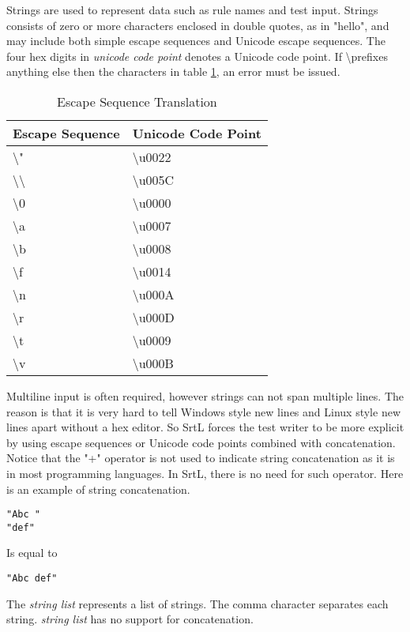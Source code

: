 

Strings are used to represent data such as rule names and test input. Strings 
consists of zero or more characters enclosed in double quotes, as in "hello", 
and may include both simple escape sequences and Unicode escape sequences.
The four hex digits in \textit{unicode code point} denotes a Unicode code point.
If \textbackslash prefixes anything else then the characters in table 
\ref{table:escape-sequence-translation}, an error must be issued.

\begin{table}[h]
    \centering
    \caption{Escape Sequence Translation}
    \label{table:escape-sequence-translation}
    \begin{tabular}{|l|l|}
        \hline
        \textbf{Escape Sequence}     & \textbf{Unicode Code Point}  \\ \hline
        \textbackslash"              & \textbackslash u0022         \\ \hline
        \textbackslash\textbackslash & \textbackslash u005C         \\ \hline
        \textbackslash 0             & \textbackslash u0000         \\ \hline
        \textbackslash a             & \textbackslash u0007         \\ \hline
        \textbackslash b             & \textbackslash u0008         \\ \hline
        \textbackslash f             & \textbackslash u0014         \\ \hline
        \textbackslash n             & \textbackslash u000A         \\ \hline
        \textbackslash r             & \textbackslash u000D         \\ \hline
        \textbackslash t             & \textbackslash u0009         \\ \hline
        \textbackslash v             & \textbackslash u000B         \\ \hline
    \end{tabular}
\end{table}

Multiline input is often required, however strings can not span multiple lines. 
The reason is that it is very hard to tell Windows style new lines and Linux 
style new lines apart without a hex editor. So SrtL forces the test writer to be
more explicit by using escape sequences or Unicode code points combined with 
concatenation. Notice that the "+" operator is not used to indicate string 
concatenation as it is in most programming languages. In SrtL, there is no need
for such operator. Here is an example of string concatenation.

\begin{lstlisting}[style = SrtL]
"Abc "
"def"
\end{lstlisting}

Is equal to 

\begin{lstlisting}[style = SrtL]
"Abc def"
\end{lstlisting}

The \textit{string list} represents a list of strings. The comma character 
separates each string. \textit{string list} has no support for concatenation.